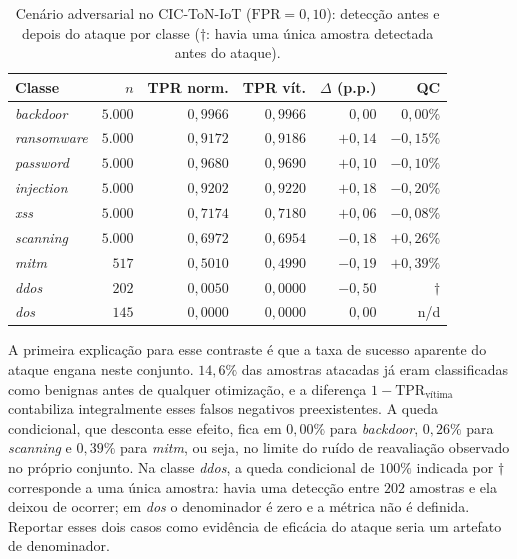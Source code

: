 \documentclass[conference]{IEEEtran}
\begin{document}
\begin{table}[!t]
\centering
\footnotesize
\setlength{\tabcolsep}{3.5pt}
\caption{Cenário adversarial no CIC-ToN-IoT ($\text{FPR} = 0{,}10$): detecção antes e depois do ataque por classe ($\dagger$: havia uma única amostra detectada antes do ataque).}
\label{tab:toniot_adv}
\begin{tabular}{@{}lrrrrr@{}}
\toprule
\textbf{Classe} & \textbf{$n$} & \textbf{TPR norm.} & \textbf{TPR vít.} & \textbf{$\Delta$ (p.p.)} & \textbf{QC} \\
\midrule
\textit{backdoor} & $5.000$ & $0{,}9966$ & $0{,}9966$ & $0{,}00$ & $0{,}00\%$ \\
\textit{ransomware} & $5.000$ & $0{,}9172$ & $0{,}9186$ & $+0{,}14$ & $-0{,}15\%$ \\
\textit{password} & $5.000$ & $0{,}9680$ & $0{,}9690$ & $+0{,}10$ & $-0{,}10\%$ \\
\textit{injection} & $5.000$ & $0{,}9202$ & $0{,}9220$ & $+0{,}18$ & $-0{,}20\%$ \\
\textit{xss} & $5.000$ & $0{,}7174$ & $0{,}7180$ & $+0{,}06$ & $-0{,}08\%$ \\
\textit{scanning} & $5.000$ & $0{,}6972$ & $0{,}6954$ & $-0{,}18$ & $+0{,}26\%$ \\
\textit{mitm} & $517$ & $0{,}5010$ & $0{,}4990$ & $-0{,}19$ & $+0{,}39\%$ \\
\textit{ddos} & $202$ & $0{,}0050$ & $0{,}0000$ & $-0{,}50$ & $\dagger$ \\
\textit{dos} & $145$ & $0{,}0000$ & $0{,}0000$ & $0{,}00$ & n/d \\
\bottomrule
\end{tabular}
\end{table}

A primeira explicação para esse contraste é que a taxa de sucesso aparente do ataque engana neste conjunto.
$14{,}6\%$ das amostras atacadas já eram classificadas como benignas antes de qualquer otimização, e a diferença $1 - \text{TPR}_{\text{vítima}}$ contabiliza integralmente esses falsos negativos preexistentes.
A queda condicional, que desconta esse efeito, fica em $0{,}00\%$ para \textit{backdoor}, $0{,}26\%$ para \textit{scanning} e $0{,}39\%$ para \textit{mitm}, ou seja, no limite do ruído de reavaliação observado no próprio conjunto.
Na classe \textit{ddos}, a queda condicional de $100\%$ indicada por $\dagger$ corresponde a uma única amostra: havia uma detecção entre $202$ amostras e ela deixou de ocorrer; em \textit{dos} o denominador é zero e a métrica não é definida.
Reportar esses dois casos como evidência de eficácia do ataque seria um artefato de denominador.
\end{document}

